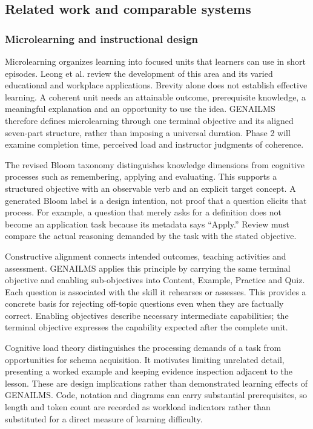 \subsection{Related work and comparable systems}\label{sec:related}
\subsubsection{Microlearning and instructional design}
Microlearning organizes learning into focused units that learners can use in short episodes. Leong et al. review the development of this area and its varied educational and workplace applications\citep{microlearning}. Brevity alone does not establish effective learning. A coherent unit needs an attainable outcome, prerequisite knowledge, a meaningful explanation and an opportunity to use the idea. GENAILMS therefore defines microlearning through one terminal objective and its aligned seven-part structure, rather than imposing a universal duration. Phase 2 will examine completion time, perceived load and instructor judgments of coherence.

The revised Bloom taxonomy distinguishes knowledge dimensions from cognitive processes such as remembering, applying and evaluating\citep{bloom}. This supports a structured objective with an observable verb and an explicit target concept. A generated Bloom label is a design intention, not proof that a question elicits that process. For example, a question that merely asks for a definition does not become an application task because its metadata says ``Apply.'' Review must compare the actual reasoning demanded by the task with the stated objective.

Constructive alignment connects intended outcomes, teaching activities and assessment\citep{alignment}. GENAILMS applies this principle by carrying the same terminal objective and enabling sub-objectives into Content, Example, Practice and Quiz. Each question is associated with the skill it rehearses or assesses. This provides a concrete basis for rejecting off-topic questions even when they are factually correct. Enabling objectives describe necessary intermediate capabilities; the terminal objective expresses the capability expected after the complete unit.

Cognitive load theory distinguishes the processing demands of a task from opportunities for schema acquisition\citep{cogload}. It motivates limiting unrelated detail, presenting a worked example and keeping evidence inspection adjacent to the lesson. These are design implications rather than demonstrated learning effects of GENAILMS. Code, notation and diagrams can carry substantial prerequisites, so length and token count are recorded as workload indicators rather than substituted for a direct measure of learning difficulty.
